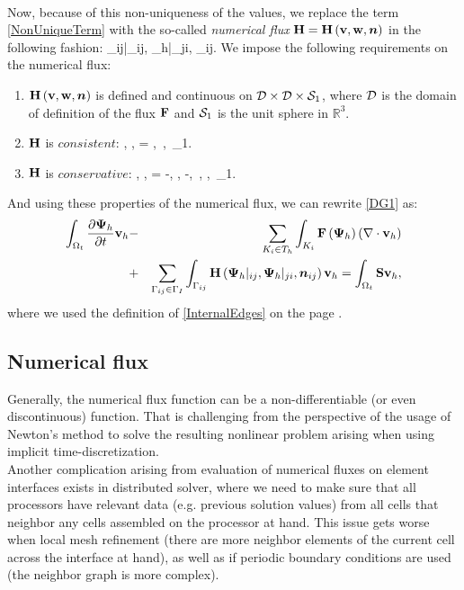 \paragraph{}
Now, because of this non-uniqueness of the values, we replace the term \ref{NonUniqueTerm} with the so-called \textit{numerical flux} $\mathrm{\mathbf{H}} = \mathrm{\mathbf{H}}\left(\mathrm{\mathbf{v}}, \mathrm{\mathbf{w}}, \mbox{\boldmath $n$}\right)$ in the following fashion:
\be
\label{NumFluxDef}
\lo\mrF{}\ro \cdot \bfn_{ij}\ro \mrvh \approx \mrH{}|_{ij}, {\mrPsi_h}|_{ji}, \bfn_{ij}\ro \mrvh.
\ee
We impose the following requirements on the numerical flux:
\begin{enumerate}
	\item $\mathrm{\mathbf{H}}\left( \mathrm{\mathbf{v}}, \mathrm{\mathbf{w}}, \mbox{\boldmath $n$}\right)$ is defined and continuous on $\mathcal{D} \times \mathcal{D} \times \mathcal{S}_1$, where $\mathcal{D}$ is the domain of definition of the flux $\mathrm{\mathbf{F}}$ and $\mathcal{S}_1$ is the unit sphere in $\mathbb{R}^3$.
	\item $\mathrm{\mathbf{H}}$ is $consistent$:
		\be
			\label{FluxConsistent} \mrH\lo \mrv, \mrv, \bfn\ro = \mrF\lo \mrv\ro \bfn,\ \mrv\in{},\ \bfn\in{}_1.
		\ee
	\item $\mathrm{\mathbf{H}}$ is $conservative$:
		\be
			\label{FluxConservative} \mrH\lo \mrv, \mrw, \bfn\ro = -\mrH\lo \mrw, \mrv, -\bfn\ro,\ \mrv, \mrw\in{},\ \bfn\in{}_1.
		\ee
 \end{enumerate}

And using these properties of the numerical flux, we can rewrite \ref{DG1} as:
\begin{eqnarray}
\label{DG2} \int_{\Omega_{t}} \frac{\partial{{\mathrm{\mathbf{\Psi}}_h}}}{\partial{t}} \mathrm{\mathbf{v}}_h & - & \sum_{K_i \in T_h}\int_{K_i}\mathrm{\mathbf{F}}\left({\mathrm{\mathbf{\Psi}}_h}\right) \left(\nabla \cdot \mathrm{\mathbf{v}}_h\right)\\ \nonumber & + & \sum_{\Gamma_{ij}\in\Gamma_I} \int_{\Gamma_{ij}} \mathrm{\mathbf{H}}\left({\mathrm{\mathbf{\Psi}}_h}|_{ij}, {\mathrm{\mathbf{\Psi}}_h}|_{ji}, \mbox{\boldmath $n$}_{ij}\right) \mathrm{\mathbf{v}}_h = \int_{\Omega_{t}} \mathrm{\mathbf{S}} \mathrm{\mathbf{v}}_h,
\end{eqnarray}
where we used the definition of \ref{InternalEdges} on the page \pageref{InternalEdges}.
\subsection{Numerical flux}
Generally, the numerical flux function can be a non-differentiable (or even discontinuous) function. That is challenging from the perspective of the usage of Newton's method to solve the resulting nonlinear problem arising when using implicit time-discretization.\ \\
Another complication arising from evaluation of numerical fluxes on element interfaces exists in distributed solver, where we need to make sure that all processors have relevant data (e.g. previous solution values) from all cells that neighbor any cells assembled on the processor at hand. This issue gets worse when local mesh refinement (there are more neighbor elements of the current cell across the interface at hand), as well as if periodic boundary conditions are used (the neighbor graph is more complex).
